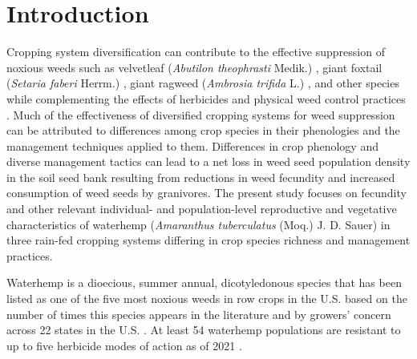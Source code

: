 \documentclass[
]{article}
\begin{document}
\hypertarget{introduction}{%
\section*{Introduction}\label{introduction}}

Cropping system diversification can contribute to the effective suppression of noxious weeds such as velvetleaf (\emph{Abutilon theophrasti} Medik.) \citep{westermanAreManyLittle2005}, giant foxtail (\emph{Setaria faberi} Herrm.) \citep{liebmanFatesSetariaFaberi2014}, giant ragweed (\emph{Ambrosia trifida} L.) \citep{liebmanCroppingSystemRedesign2020}, and other species while complementing the effects of herbicides and physical weed control practices \citep{davisIncreasingCroppingSystem2012, weisbergerDoesDiversifyingCrop2019}.
Much of the effectiveness of diversified cropping systems for weed suppression can be attributed to differences among crop species in their phenologies and the management techniques applied to them. Differences in crop phenology and diverse management tactics can lead to a net loss in weed seed population density in the soil seed bank \citep{maclarenEcologicalFutureWeed2020, liebmanManyLittleHammers1997} resulting from reductions in weed fecundity and increased consumption of weed seeds by granivores. The present study focuses on fecundity and other relevant individual- and population-level reproductive and vegetative characteristics of waterhemp (\emph{Amaranthus tuberculatus} (Moq.) J. D. Sauer) in three rain-fed cropping systems differing in crop species richness and management practices.

Waterhemp is a dioecious, summer annual, dicotyledonous species that has been listed as one of the five most noxious weeds in row crops in the U.S. based on the number of times this species appears in the literature \citep{johnsonInfluenceGlyphosateresistantCropping2009} and by growers' concern across 22 states in the U.S. \citep{princeBenchmarkStudyIV2012}. At least 54 waterhemp populations are resistant to up to five herbicide modes of action as of 2021 \citep{heapHerbicideResistantTall2021}.
\end{document}
